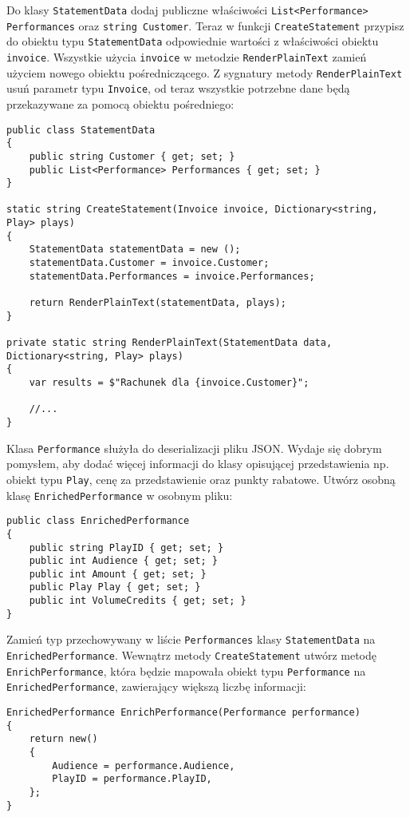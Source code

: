 Do klasy \texttt{StatementData} dodaj publiczne właściwości \texttt{List<Performance> Performances} oraz \texttt{string Customer}. Teraz w funkcji \texttt{CreateStatement} przypisz do obiektu typu \texttt{StatementData} odpowiednie wartości z właściwości obiektu \texttt{invoice}. Wszystkie użycia \texttt{invoice} w metodzie \texttt{RenderPlainText} zamień użyciem nowego obiektu pośredniczącego. Z sygnatury metody \texttt{RenderPlainText} usuń parametr typu \texttt{Invoice}, od teraz wszystkie potrzebne dane będą przekazywane za pomocą obiektu pośredniego:
\begin{lstlisting}
public class StatementData
{
	public string Customer { get; set; }
	public List<Performance> Performances { get; set; }
}

static string CreateStatement(Invoice invoice, Dictionary<string, Play> plays)
{
	StatementData statementData = new ();
	statementData.Customer = invoice.Customer;
	statementData.Performances = invoice.Performances;
	
	return RenderPlainText(statementData, plays);
}

private static string RenderPlainText(StatementData data, Dictionary<string, Play> plays)
{
	var results = $"Rachunek dla {invoice.Customer}";
	
	//...
}
\end{lstlisting}

Klasa \texttt{Performance} służyła do deserializacji pliku JSON. Wydaje się dobrym pomysłem, aby dodać więcej informacji do klasy opisującej przedstawienia np. obiekt typu \texttt{Play}, cenę za przedstawienie oraz punkty rabatowe. Utwórz osobną klasę \texttt{EnrichedPerformance} w osobnym pliku:
\begin{lstlisting}
public class EnrichedPerformance
{
	public string PlayID { get; set; }
	public int Audience { get; set; }
	public int Amount { get; set; }
	public Play Play { get; set; }
	public int VolumeCredits { get; set; }
}
\end{lstlisting}

Zamień typ przechowywany w liście \texttt{Performances} klasy \texttt{StatementData} na \texttt{EnrichedPerformance}. Wewnątrz metody \texttt{CreateStatement} utwórz metodę \texttt{EnrichPerformance}, która będzie mapowała obiekt typu \texttt{Performance} na \texttt{EnrichedPerformance}, zawierający większą liczbę informacji:
\begin{lstlisting}
EnrichedPerformance EnrichPerformance(Performance performance)
{	
	return new()
	{
		Audience = performance.Audience,
		PlayID = performance.PlayID,
	};
}
\end{lstlisting}

